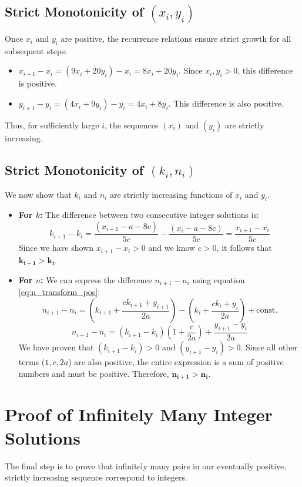 \documentclass[12pt]{article}
\begin{document}
\subsection{Strict Monotonicity of $(x_i, y_i)$}
Once $x_i$ and $y_i$ are positive, the recurrence relations ensure strict growth for all subsequent steps:
\begin{itemize}
    \item $x_{i+1} - x_i = (9x_i + 20y_i) - x_i = 8x_i + 20y_i$. Since $x_i, y_i > 0$, this difference is positive.
    \item $y_{i+1} - y_i = (4x_i + 9y_i) - y_i = 4x_i + 8y_i$. This difference is also positive.
\end{itemize}
Thus, for sufficiently large $i$, the sequences $(x_i)$ and $(y_i)$ are strictly increasing.

\subsection{Strict Monotonicity of $(k_i, n_i)$}
We now show that $k_i$ and $n_i$ are strictly increasing functions of $x_i$ and $y_i$.
\begin{itemize}
    \item \textbf{For $k$:} The difference between two consecutive integer solutions is:
    $$k_{i+1} - k_i = \frac{(x_{i+1} - a - 8c)}{5c} - \frac{(x_i - a - 8c)}{5c} = \frac{x_{i+1} - x_i}{5c}$$
    Since we have shown $x_{i+1} - x_i > 0$ and we know $c>0$, it follows that $\boldsymbol{k_{i+1} > k_i}$.

    \item \textbf{For $n$:} We can express the difference $n_{i+1} - n_i$ using equation \eqref{eq:n_transform_pos}:
    $$n_{i+1} - n_i = \left( k_{i+1} + \frac{c k_{i+1} + y_{i+1}}{2a} \right) - \left( k_i + \frac{c k_i + y_i}{2a} \right) + \text{const.}$$
    $$n_{i+1} - n_i = (k_{i+1}-k_i)\left(1+\frac{c}{2a}\right) + \frac{y_{i+1}-y_i}{2a}$$
    We have proven that $(k_{i+1}-k_i) > 0$ and $(y_{i+1}-y_i) > 0$. Since all other terms ($1, c, 2a$) are also positive, the entire expression is a sum of positive numbers and must be positive. Therefore, $\boldsymbol{n_{i+1} > n_i}$.
\end{itemize}

\section{Proof of Infinitely Many Integer Solutions}
The final step is to prove that infinitely many pairs in our eventually positive, strictly increasing sequence correspond to integers.
\end{document}

